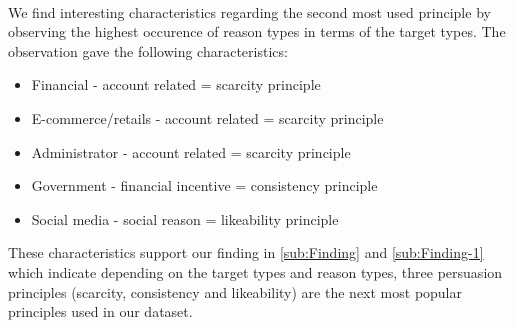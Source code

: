 \ \\
We find interesting characteristics regarding the second most used
principle by observing the highest occurence of reason types in terms
of the target types. The observation gave the following characteristics:
\begin{itemize}
\item Financial - account related = scarcity principle
\item E-commerce/retails - account related = scarcity principle
\item Administrator - account related = scarcity principle
\item Government - financial incentive = consistency principle
\item Social media - social reason = likeability principle
\end{itemize}
These characteristics support our finding in \autoref{sub:Finding}
and \autoref{sub:Finding-1} which indicate depending on the target
types and reason types, three persuasion principles (scarcity, consistency
and likeability) are the next most popular principles used in our
dataset.%

